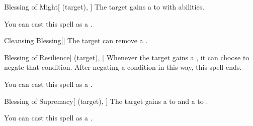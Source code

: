 \lowercase{\hypertarget{spell:Blessing of Might}{}}\label{spell:Blessing of Might}
\begin{attuneability}[\nth{2}]{\hypertarget{spell:Blessing of Might}{Blessing of Might}}[ (target), ]
The target gains a   to  with  abilities.

You can cast this spell as a .
\end{attuneability}
\vspace{0.25em}



\lowercase{\hypertarget{spell:Cleansing Blessing}{}}\label{spell:Cleansing Blessing}
\begin{freeability}[\nth{2}]{\hypertarget{spell:Cleansing Blessing}{Cleansing Blessing}}[]
The target can remove a .
\end{freeability}
\vspace{0.25em}



\lowercase{\hypertarget{spell:Blessing of Resilience}{}}\label{spell:Blessing of Resilience}
\begin{attuneability}[\nth{3}]{\hypertarget{spell:Blessing of Resilience}{Blessing of Resilience}}[ (target), ]
Whenever the target gains a , it can choose to negate that condition.
After negating a condition in this way, this spell ends.

You can cast this spell as a .
\end{attuneability}
\vspace{0.25em}



\lowercase{\hypertarget{spell:Blessing of Supremacy}{}}\label{spell:Blessing of Supremacy}
\begin{attuneability}[\nth{3}]{\hypertarget{spell:Blessing of Supremacy}{Blessing of Supremacy}}[ (target), ]
The target gains a   to  and a   to .

You can cast this spell as a .
\end{attuneability}
\vspace{0.25em}



